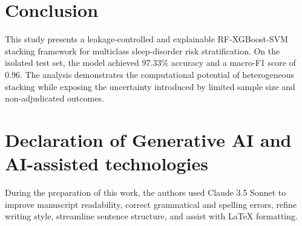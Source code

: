\documentclass{turkjour}%
\begin{document}
\section{Conclusion}
This study presents a leakage-controlled and explainable RF-XGBoost-SVM stacking framework for multiclass sleep-disorder risk stratification. On the isolated test set, the model achieved 97.33\% accuracy and a macro-F1 score of 0.96. The analysis demonstrates the computational potential of heterogeneous stacking while exposing the uncertainty introduced by limited sample size and non-adjudicated outcomes.


\section*{Declaration of Generative AI and AI-assisted technologies}
During the preparation of this work, the authors used Claude 3.5 Sonnet to improve manuscript readability, correct grammatical and spelling errors, refine writing style, streamline sentence structure, and assist with LaTeX formatting. 
\end{document}
